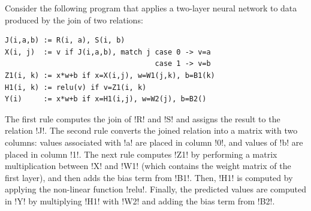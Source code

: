 \documentclass[sigconf,nonacm]{acmart}
\begin{document}
 Consider the following program that applies a two-layer neural network to data produced by the join of two relations:


\begin{myboxed}
\begin{lstlisting}
J(i,a,b) := R(i, a), S(i, b)
X(i, j)  := v if J(i,a,b), match j case 0 -> v=a
                                   case 1 -> v=b
Z1(i, k) := x*w+b if x=X(i,j), w=W1(j,k), b=B1(k)
H1(i, k) := relu(v) if v=Z1(i, k)
Y(i)     := x*w+b if x=H1(i,j), w=W2(j), b=B2()
\end{lstlisting}
\end{myboxed}

The first rule computes the join of !R! and !S! and assigns the result to the relation !J!. The second rule converts the joined relation into a matrix with two columns: values associated with !a! are placed in column !0!, and values of !b! are placed in column !1!. The next rule computes !Z1! by performing a matrix multiplication between !X! and !W1! (which contains the weight matrix of the first layer), and then adds the bias term from !B1!. Then, !H1! is computed by applying the non-linear function !relu!. Finally, the predicted values are computed in !Y! by multiplying !H1! with !W2! and adding the bias term from !B2!.
\end{document}
